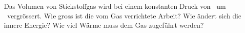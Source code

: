 Das Volumen von Stickstoffgas wird bei einem konstanten Druck von \pNO\ um \dVO\ vergrössert. Wie gross ist die vom Gas verrichtete Arbeit? Wie ändert sich die innere Energie? Wie viel Wärme muss dem Gas zugeführt werden?
